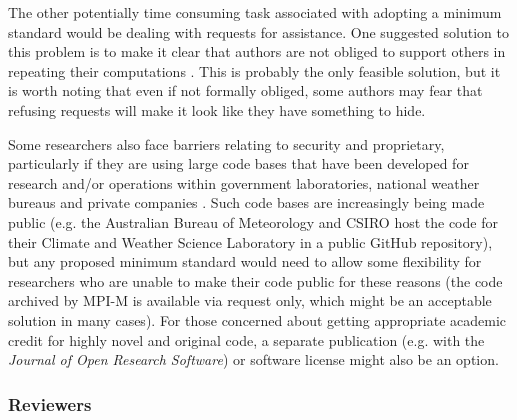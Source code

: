 The other potentially time consuming task associated with adopting a minimum standard would be dealing with requests for assistance. One suggested solution to this problem is to make it clear that authors are not obliged to support others in repeating their computations \citep{Easterbrook2014}. This is probably the only feasible solution, but it is worth noting that even if not formally obliged, some authors may fear that refusing requests will make it look like they have something to hide. 

Some researchers also face barriers relating to security and proprietary, particularly if they are using large code bases that have been developed for research and/or operations within government laboratories, national weather bureaus and private companies \citep{Stodden2010}. Such code bases are increasingly being made public (e.g. the Australian Bureau of Meteorology and CSIRO host the code for their Climate and Weather Science Laboratory in a public GitHub repository), but any proposed minimum standard would need to allow some flexibility for researchers who are unable to make their code public for these reasons (the code archived by MPI-M is available via request only, which might be an acceptable solution in many cases). For those concerned about getting appropriate academic credit for highly novel and original code, a separate publication (e.g. with the \textit{Journal of Open Research Software}) or software license \citep[e.g.][]{Morin2012} might also be an option.

\subsubsection{Reviewers}

